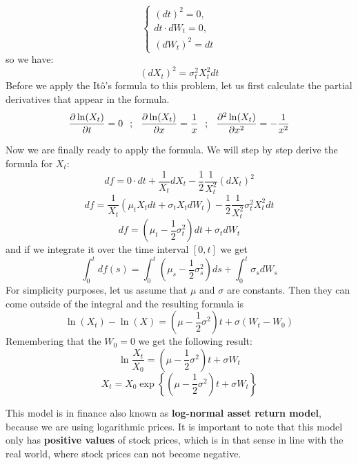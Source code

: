 \documentclass[times, utf8, diplomski]{fer}
\begin{document}
$$ \left\{ \begin{array}{c} (dt)^2 = 0, \\ dt\cdot dW_t = 0, \\ (dW_t)^2 = dt \end{array} \right. $$ so we have: $$(dX_t)^2 = \sigma_t^2X_t^2dt$$
Before we apply the It\^{o}'s formula to this problem, let us first calculate the partial derivatives that appear in the formula. 
$$
	\frac{\partial \ln(X_t)}{\partial t} = 0 \hspace{0.25cm} ; \hspace{0.25cm} \frac{\partial \ln(X_t)}{\partial x} = \frac{1}{x} \hspace{0.25cm} ; \hspace{0.25cm} \frac{\partial^2 \ln(X_t)}{\partial x^2} = -\frac{1}{x^2}
$$

Now we are finally ready to apply the formula. We will step by step derive the formula for $X_t$:
$$ df = 0\cdot dt + \frac{1}{X_t}dX_t - \frac{1}{2} \frac{1}{X_t^2}(dX_t)^2 $$
$$ df = \frac{1}{X_t} (\mu_t X_t dt + \sigma_t X_t dW_t) - \frac{1}{2}\frac{1}{X_t^2}\sigma_t^2 X_t^2 dt$$
$$ df = (\mu_t - \frac{1}{2}\sigma_t^2)dt + \sigma_t dW_t  $$
and if we integrate it over the time interval $[0,t]$ we get
$$ \int_0^t df(s) = \int_0^t (\mu_s - \frac{1}{2}\sigma_s^2) ds + \int_0^t \sigma_s dW_s $$
For simplicity purposes, let us assume that $\mu$ and $\sigma$ are constants. Then they can come outside of the integral and the resulting formula is
$$ \ln(X_t) - \ln(X) = (\mu-\frac{1}{2}\sigma^2)t + \sigma (W_t - W_0) $$
Remembering that the $W_0 = 0$ we get the following result:
$$ \ln\frac{X_t}{X_0} = (\mu-\frac{1}{2}\sigma^2)t + \sigma W_t $$
\begin{equation} \label{eqn_gbm}
	X_t = X_0\exp\left\{ (\mu-\frac{1}{2}\sigma^2)t + \sigma W_t \right\}
\end{equation}

This model is in finance also known as \textbf{log-normal asset return model}, because we are using logarithmic prices. It is important to note that this model only has \textbf{positive values} of stock prices, which is in that sense in line with the real world, where stock prices can not become negative. 

\vspace{1cm}
\begin{center}
\end{center}
\end{document}
